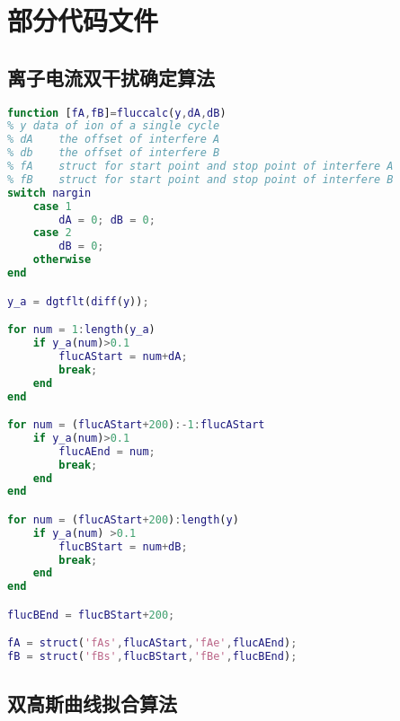 \chapter{部分代码文件}
\section{离子电流双干扰确定算法}
\label{cd:dintf}
\lstset{
	basicstyle=\ttfamily\scriptsize,
	breaklines=true}
	
\begin{lstlisting}[frame=single,language=matlab]
function [fA,fB]=fluccalc(y,dA,dB)
% y	data of ion of a single cycle
% dA 	the offset of interfere A
% db 	the offset of interfere B
% fA 	struct for start point and stop point of interfere A
% fB 	struct for start point and stop point of interfere B
switch nargin
    case 1
        dA = 0; dB = 0;
    case 2
        dB = 0;
    otherwise
end

y_a = dgtflt(diff(y));

for num = 1:length(y_a)
    if y_a(num)>0.1
        flucAStart = num+dA;
        break;
    end
end

for num = (flucAStart+200):-1:flucAStart
    if y_a(num)>0.1
        flucAEnd = num;
        break;
    end
end

for num = (flucAStart+200):length(y)
    if y_a(num) >0.1
        flucBStart = num+dB;
        break;
    end
end

flucBEnd = flucBStart+200;

fA = struct('fAs',flucAStart,'fAe',flucAEnd);
fB = struct('fBs',flucBStart,'fBe',flucBEnd);
\end{lstlisting}
\section{双高斯曲线拟合算法}
\label{cd:dgauss}
\lstset{
	basicstyle=\ttfamily\scriptsize,
	breaklines=true}
	
